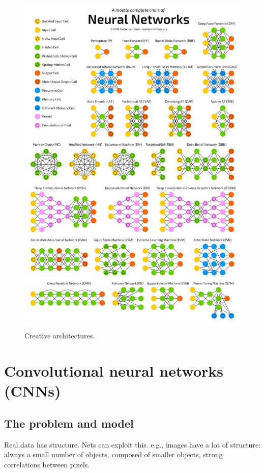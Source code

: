 \documentclass[english]{article}
\begin{document}
\begin{figure}
  \centering
  \includegraphics[scale=0.35]{Chart.png}
  \caption{Creative architectures.}
  \label{arch}
\end{figure}


\eenum



\section{Convolutional neural networks (CNNs)}
\subsection{The problem and model}
\benum
\item Real data has structure. Nets can exploit this. e.g., images have a lot of structure: always a small number of objects, composed of smaller objects, strong correlations between pixels. 
\end{document}
